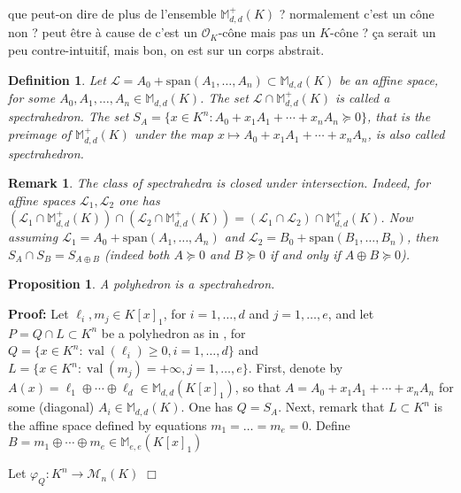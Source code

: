 \documentclass[a4paper,12pt]{article}
\newenvironment{proof}{\hbox{}\vspace{-0.8cm} {\bf Proof:}}{\hfill $\Box$}
\newtheorem{proposition}{Proposition}
\newtheorem{definition}{Definition}
\newtheorem{remark}{Remark}
\newcommand{\allmat}{\mathbb{M}} %
\renewcommand{\span}[1]{{\text{span}(#1)}} %
\newcommand{\simone}[1]{{\color{blue} #1}} %
\DeclareMathOperator{\val}{val}
\newcommand{\OK}{\mathcal{O}_K}
\begin{document}
\simone{que peut-on dire de plus de l'ensemble $\allmat_{d,d}^+(K)$ ? normalement c'est un cône non ? peut être
  à cause de \Cref{caracsdp} c'est un $\OK$-cône mais pas un $K$-cône ? ça serait un peu contre-intuitif, mais
  bon, on est sur un corps abstrait.}

\begin{definition}
  \label{def_spectrahedra}
  Let $\mathcal{L} = A_0+\span{A_1,\ldots,A_n} \subset \allmat_{d,d}(K)$ be an affine space, for some
  $A_0,A_1,\ldots,A_n \in \allmat_{d,d}(K)$.
  The set $\mathcal{L} \cap \allmat_{d,d}^+(K)$ is called a \emph{spectrahedron}. The set 
  $S_A = \{x \in K^n : A_0+x_1A_1+\cdots+x_nA_n \succeq 0\}$, that is the preimage of $\allmat_{d,d}^+(K)$
  under the map $x \mapsto A_0+x_1A_1+\cdots+x_nA_n$, is also called spectrahedron.
\end{definition}

\begin{remark}
  The class of spectrahedra is closed under intersection. Indeed, for affine spaces $\mathcal{L}_1,\mathcal{L}_2$
  one has $(\mathcal{L}_1 \cap \allmat_{d,d}^+(K)) \cap (\mathcal{L}_2 \cap \allmat_{d,d}^+(K)) =
  (\mathcal{L}_1 \cap \mathcal{L}_2) \cap \allmat_{d,d}^+(K)$. Now
  assuming $\mathcal{L}_1 = A_0+\span{A_1,\ldots,A_n}$ and $\mathcal{L}_2 = B_0+\span{B_1,\ldots,B_n}$,
  then $S_A \cap S_B = S_{A \oplus B}$ (indeed both $A \succeq 0$ and $B \succeq 0$ if and only if
  $A \oplus B \succeq 0$).
\end{remark}

\begin{proposition}
  A polyhedron is a spectrahedron.
\end{proposition}
\begin{proof}
  Let $\ell_i,m_j \in K[x]_1$, for $i=1,\ldots,d$ and $j=1,\ldots,e$, and let $P = Q \cap L \subset K^n$
  be a polyhedron as in , for $Q = \{x \in K^n : \val(\ell_i) \geq 0, i=1,\ldots,d\}$
  and $L = \{x \in K^n : \val(m_j) = +\infty, j=1,\ldots,e\}$.
  First, denote by $A(x) = \ell_1 \oplus \cdots \oplus \ell_d \in \allmat_{d,d}(K[x]_1)$,
  so that $A = A_0+x_1A_1+\cdots+x_nA_n$ for some (diagonal) $A_i \in \allmat_{d,d}(K)$.
  One has $Q=S_A$.
  Next, remark that $L \subset K^n$ is the affine space defined by equations $m_1=\ldots=m_e=0$.
  Define $B = m_1 \oplus \cdots \oplus m_e \in \allmat_{e,e}(K[x]_1)$

  Let $\varphi_Q : K^n \to \mathcal{M}_n(K)$
\end{proof}
\end{document}
